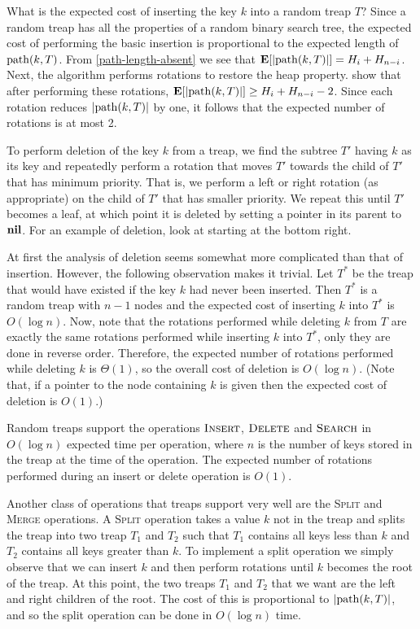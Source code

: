 What is the expected cost of inserting the key $k$ into a random treap $T$?
Since a random treap has all the properties of a random binary search tree,
the expected cost of performing the basic insertion is proportional to the
expected length of $\mathrm{path}(k,T)$.  From \eqref{path-length-absent} we see
that $\mathbf{E}[|\mathrm{path}(k,T)|]=H_i+H_{n-i}$.  Next, the algorithm performs
rotations to restore the heap property.   show
that after performing these rotations, $\mathbf{E}[|\mathrm{path}(k,T)|]\ge H_i+H_{n-i}-2$.
Since each rotation reduces $|\mathrm{path}(k,T)|$ by one, it follows that the
expected number of rotations is at most 2.

To perform deletion of the key $k$ from a treap, we find the subtree
$T'$ having $k$ as its key and repeatedly perform a rotation that
moves $T'$ towards the child of $T'$ that has minimum priority.  That
is, we perform a left or right rotation (as appropriate) on the child
of $T'$ that has smaller priority.  We repeat this until $T'$ becomes
a leaf, at which point it is deleted by setting a pointer in its
parent to $\mathbf{nil}$.  For an example of deletion, look at
 starting at the bottom right.

At first the analysis of deletion seems somewhat more complicated than
that of insertion.  However, the following observation makes it
trivial.  Let $T^*$ be the treap that would have existed if the key
$k$ had never been inserted.  Then $T^*$ is a random treap with $n-1$
nodes and the expected cost of inserting $k$ into $T^*$ is $O(\log
n)$.  Now, note that the rotations performed while deleting $k$ from
$T$ are exactly the same rotations performed while inserting $k$ into
$T^*$, only they are done in reverse order.  Therefore, the expected
number of rotations performed while deleting $k$ is $\Theta(1)$, so
the overall cost of deletion is $O(\log n)$.  (Note that, if a pointer
to the node containing $k$ is given then the expected cost of deletion
is $O(1)$.)

\begin{thm}
Random treaps support the operations $\textsc{Insert}$,
$\textsc{Delete}$ and $\textsc{Search}$ in $O(\log n)$ expected time
per operation, where $n$ is the number of keys stored in the treap at
the time of the operation.  The expected number of rotations performed
during an insert or delete operation is $O(1)$.
\end{thm}

Another class of operations that treaps support very well are the
\textsc{Split} and \textsc{Merge} operations.  A \textsc{Split}
operation takes a value $k$ not in the treap and splits the treap into
two treap $T_1$ and $T_2$ such that $T_1$ contains all keys less than
$k$ and $T_2$ contains all keys greater than $k$.  To implement a
split operation we simply observe that we can insert $k$ and then
perform rotations until $k$ becomes the root of the treap.  At this
point, the two treaps $T_1$ and $T_2$ that we want are the left and
right children of the root.  The cost of this is proportional to
$|\mathrm{path}(k,T)|$, and so the split operation can be done in $O(\log n)$
time.

